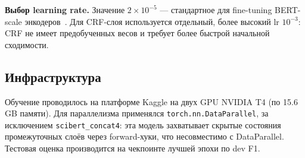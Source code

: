 \textbf{Выбор learning rate.} Значение $2 \times 10^{-5}$ --- стандартное для fine-tuning BERT-scale энкодеров~\cite{devlin2019bert}. Для CRF-слоя используется отдельный, более высокий lr $10^{-3}$: CRF не имеет предобученных весов и требует более быстрой начальной сходимости.

\subsection{Инфраструктура}

Обучение проводилось на платформе Kaggle на двух GPU NVIDIA T4 (по 15.6 GB памяти). Для параллелизма применялся \texttt{torch.nn.DataParallel}, за исключением \texttt{scibert\_concat4}: эта модель захватывает скрытые состояния промежуточных слоёв через forward-хуки, что несовместимо с DataParallel. Тестовая оценка производится на чекпоинте лучшей эпохи по dev F1.
